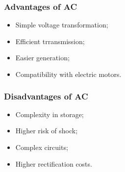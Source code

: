 \documentclass{article}
\begin{document}
\begin{minipage}
    {0.5\textwidth}
    \begin{center}
        \begin{flushleft}
            \subsubsection{Advantages of AC}
        \end{flushleft}
        \begin{itemize}
            \item Simple voltage transformation;
            \item Efficient trransmission;
            \item Easier generation;
            \item Compatibility with electric motors.
        \end{itemize}
    \end{center}
\end{minipage}
\begin{minipage}
    {0.5\textwidth}
    \begin{center}
        \begin{flushleft}
            \subsubsection{Disadvantages of AC}
        \end{flushleft}
        \begin{itemize}
            \item Complexity in storage;
            \item Higher risk of shock;
            \item Complex circuits;
            \item Higher rectification costs.
        \end{itemize}
    \end{center}
\end{minipage}
\end{document}
